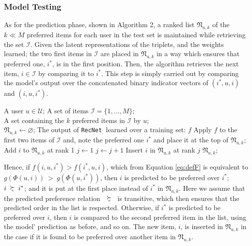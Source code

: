 \documentclass[10pt,journal,compsoc]{IEEEtran}
\newcommand{\userS}{\mathcal{U}}
\newcommand{\itemS}{\mathcal{I}}
\newcommand{\RecNet}{\texttt{RecNet}}
\newcommand{\prefu}{\renewcommand\arraystretch{.2} \begin{array}{c}
   {\succ} \\  \mbox{{\tiny {\it u}}}
  \end{array}\renewcommand\arraystretch{1ex}}
\begin{document}
\begin{sloppypar}
\subsubsection*{Model Testing}
As for the prediction phase, shown in Algorithm 2, a ranked list $\mathfrak N_{u,k}$ of the $k\ll M$ preferred items for each user in the test set is maintained while retrieving the set $\mathcal I$. Given the latent representations of the triplets, and the weights learned; the two first items in $\mathcal I$ are placed in $\mathfrak N_{u,k}$ in a way which ensures that preferred one, $i^*$, is in the first position. Then, the algorithm retrieves the next item, $i\in \mathcal I$ by comparing it to $i^*$. This step is simply carried out by comparing the model's output over the concatenated binary indicator vectors of $(i^*, u, i)$ and $(i, u, i^*)$.

\medskip

\begin{algorithm}[b!]
\caption{{\RecNet$_.$}: Testing phase}
\begin{algorithmic}[J]
\REQUIRE \STATE A user $u\in\userS$; A set of items $\itemS=\{1,\ldots,M\}$; \\
A set containing the $k$ preferred items in $\itemS$ by $u$;\\
$\mathfrak N_{u,k} \leftarrow \varnothing$;
\STATE The output of {\RecNet}$_{.}$ learned over a training set: $f$
\STATE Apply $f$ to the first two items of $\mathcal I$ and, note the preferred one $i^*$ and place it at the top of $\mathfrak N_{u,k}$;
			\STATE Add $i$ to $\mathfrak N_{u,k}$ at rank 1
		\ELSE
		    \STATE $j\leftarrow 1$
			    \STATE $j\leftarrow j+1$
			\ENDWHILE
              \STATE Insert $i$ in $\mathfrak N_{u,k}$ at rank $j$
            \ENDIF
        \ENDIF
\ENDFOR
\ENSURE $\mathfrak N_{u,k}$;
\end{algorithmic}
\end{algorithm}

Hence, if $f(i,u,i^*)>f(i^*,u,i)$, which from Equation \ref{eq:defF} is equivalent to $g(\Phi(u,i))~>~g(\Phi(u,i^*))$, then $i$ is predicted to be preferred over $i^*$; $i \prefu i^*$; and it is put at the first place instead of $i^*$ in $\mathfrak N_{u,k}$. Here we assume that the predicted preference relation \!\!$\prefu$\!\! is transitive, which then ensures that the predicted order in the list is respected. Otherwise, if $i^*$ is predicted to be preferred over $i$, then $i$ is compared to the second preferred item in the list, using the model' prediction as before, and so on. The new item, $i$, is inserted in $\mathfrak N_{u,k}$ in the case if it is found to be preferred over another item in $\mathfrak N_{u,k}$.


\end{sloppypar}
\end{document}
